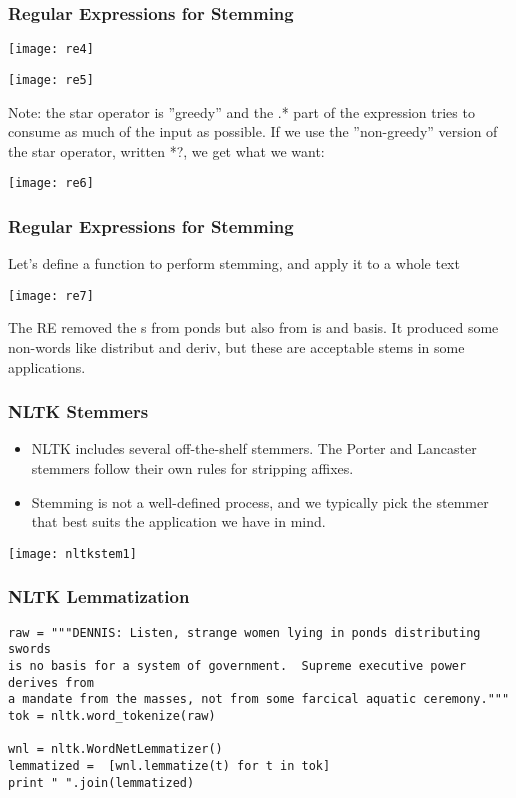 \begin{frame}[fragile]
\frametitle{ Regular Expressions for Stemming }
\begin{center}
\texttt{[image: re4]}

\texttt{[image: re5]}
\end{center}
Note: the star operator is ''greedy'' and the .* part of the expression tries to consume as much of the input as possible. If we use the ''non-greedy'' version of the star operator, written *?, we get what we want: 
\begin{center}
\texttt{[image: re6]}
\end{center}
\end{frame}

\begin{frame}[fragile]
\frametitle{ Regular Expressions for Stemming }
Let's define a function to perform stemming, and apply it to a whole text

\begin{center}
\texttt{[image: re7]}
\end{center}
The RE removed the s from ponds but also from is and basis. It produced some non-words like distribut and deriv, but these are acceptable stems in some applications.
\end{frame}

\begin{frame}[fragile]
\frametitle{ NLTK Stemmers }
\begin{itemize}
\item NLTK includes several off-the-shelf stemmers. The Porter and Lancaster stemmers follow their own rules for stripping affixes. 
\item Stemming is not a well-defined process, and we typically pick the stemmer that best suits the application we have in mind. 
\end{itemize}
\begin{center}
\texttt{[image: nltkstem1]}
\end{center}
\end{frame}

\begin{frame}[fragile]
\frametitle{ NLTK Lemmatization }
\begin{lstlisting}
raw = """DENNIS: Listen, strange women lying in ponds distributing swords
is no basis for a system of government.  Supreme executive power derives from
a mandate from the masses, not from some farcical aquatic ceremony."""
tok = nltk.word_tokenize(raw)

wnl = nltk.WordNetLemmatizer()
lemmatized =  [wnl.lemmatize(t) for t in tok]
print " ".join(lemmatized) 
\end{lstlisting}
\end{frame}

